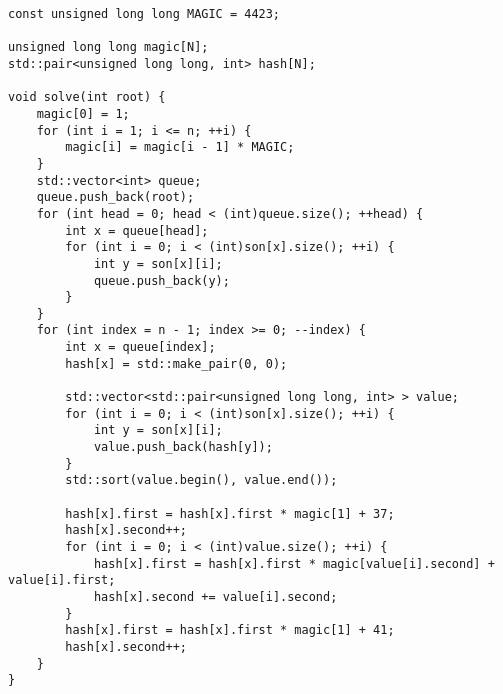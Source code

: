 \begin{lstlisting}
const unsigned long long MAGIC = 4423;

unsigned long long magic[N];
std::pair<unsigned long long, int> hash[N];

void solve(int root) {
    magic[0] = 1;
    for (int i = 1; i <= n; ++i) {
        magic[i] = magic[i - 1] * MAGIC;
    }
    std::vector<int> queue;
    queue.push_back(root);
    for (int head = 0; head < (int)queue.size(); ++head) {
        int x = queue[head];
        for (int i = 0; i < (int)son[x].size(); ++i) {
            int y = son[x][i];
            queue.push_back(y);
        }
    }
    for (int index = n - 1; index >= 0; --index) {
        int x = queue[index];
        hash[x] = std::make_pair(0, 0);

        std::vector<std::pair<unsigned long long, int> > value;
        for (int i = 0; i < (int)son[x].size(); ++i) {
            int y = son[x][i];
            value.push_back(hash[y]);
        }
        std::sort(value.begin(), value.end());
        
        hash[x].first = hash[x].first * magic[1] + 37;
        hash[x].second++;
        for (int i = 0; i < (int)value.size(); ++i) {
            hash[x].first = hash[x].first * magic[value[i].second] + value[i].first;
            hash[x].second += value[i].second;
        }
        hash[x].first = hash[x].first * magic[1] + 41;
        hash[x].second++;
    }
}
\end{lstlisting}
